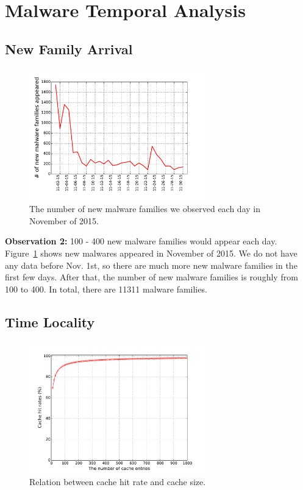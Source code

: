 
\section{Malware Temporal Analysis}
\label{sec:predict}

\subsection{New Family Arrival}
\begin{figure}[t!]
\begin{center}
\includegraphics[width=3.0in]{figure/new_family}
\caption{The number of new malware families we observed each day in November of 2015.}
\label{fig:new}
\end{center}
\end{figure}
{\bf Observation 2:} 
100 - 400 new malware families would appear each day. 
Figure~\ref{fig:new} shows new malwares appeared in November of 2015. 
We do not have any data before Nov. 1st, 
so there are much more new malware families in the first few days.
After that, the number of new malware families is roughly from 100 to 400. 
In total, there are 11311 malware families. 

\subsection{Time Locality}

\begin{figure}[t!]
\begin{center}
\includegraphics[width=3.0in]{figure/LRU}
\caption{Relation between cache hit rate and cache size.}
\label{fig:cache}
\end{center}
\end{figure}


